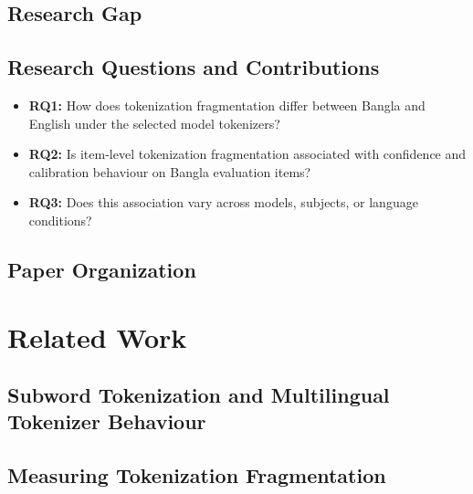 \documentclass[runningheads]{llncs}
\begin{document}
\subsection{Research Gap}

\subsection{Research Questions and Contributions}
\begin{itemize}
	\item \textbf{RQ1:} How does tokenization fragmentation differ between Bangla and English under the selected model tokenizers?
	\item \textbf{RQ2:} Is item-level tokenization fragmentation associated with confidence and calibration behaviour on Bangla evaluation items?
	\item \textbf{RQ3:} Does this association vary across models, subjects, or language conditions?
\end{itemize}

\subsection{Paper Organization}

\section{Related Work}
\subsection{Subword Tokenization and Multilingual Tokenizer Behaviour}

\subsection{Measuring Tokenization Fragmentation}
\end{document}
